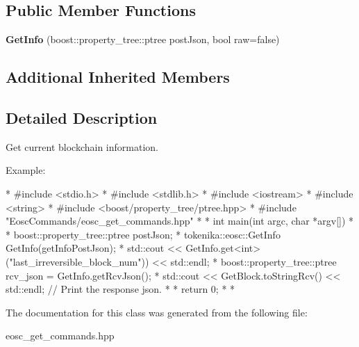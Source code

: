 \subsection*{Public Member Functions}
\begin{DoxyCompactItemize}
\item 
\mbox{\label{classtokenika_1_1eosc_1_1_get_info_a3b219ff2f0036acbecf97922e28c3793}} 
{\bfseries Get\+Info} (boost\+::property\+\_\+tree\+::ptree post\+Json, bool raw=false)
\end{DoxyCompactItemize}
\subsection*{Additional Inherited Members}


\subsection{Detailed Description}
Get current blockchain information. 

Example\+:

\begin{DoxyVerb}* #include <stdio.h>
* #include <stdlib.h>
* #include <iostream>
* #include <string>
* #include <boost/property_tree/ptree.hpp>
* #include "EoscCommands/eosc_get_commands.hpp"
* 
* int main(int argc, char *argv[])
* {
* boost::property_tree::ptree postJson;
* tokenika::eosc::GetInfo GetInfo(getInfoPostJson);
* std::cout << GetInfo.get<int>("last_irreversible_block_num")) << std::endl;
* boost::property_tree::ptree rcv_json = GetInfo.getRcvJson();
* std::cout << GetBlock.toStringRcv() << std::endl; // Print the response json.
* 
* return 0;
* }
* \end{DoxyVerb}
 

The documentation for this class was generated from the following file\+:\begin{DoxyCompactItemize}
\item 
eosc\+\_\+get\+\_\+commands.\+hpp\end{DoxyCompactItemize}
